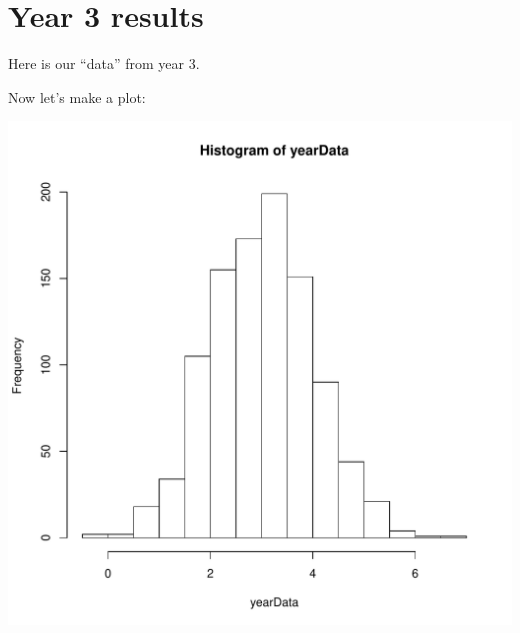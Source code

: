 \section{Year 3 results}
Here is our ``data'' from year 3.
\begin{knitrout}
\color{fgcolor}\begin{kframe}
\begin{alltt}
 \hlkwb{=} \hlstd{(}\hlstd{,}  
\hlopt{::}\hlopt{$}\hlstd{(} \hlstd{=} \hlstd{(}\hlstd{))}
\end{alltt}
\end{kframe}
\end{knitrout}
Now let's make a plot:
\begin{knitrout}
\color{fgcolor}\begin{kframe}
\begin{alltt}
\end{alltt}
\end{kframe}
\includegraphics[width=\maxwidth]{year3/histogram-1} 

\end{knitrout}

